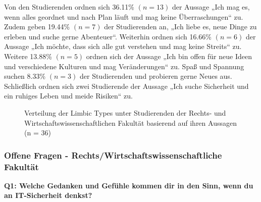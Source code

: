 \documentclass[german,report]{i1thesis}
\begin{document}
Von den Studierenden ordnen sich 36.11\% \((n = 13)\) der Aussage „Ich mag es, wenn alles geordnet und nach Plan läuft und mag keine Überraschungen“ zu. Zudem geben 19.44\% \((n = 7)\) der Studierenden an, „Ich liebe es, neue Dinge zu erleben und suche gerne Abenteuer“. Weiterhin ordnen sich 16.66\% \((n = 6)\) der Aussage „Ich möchte, dass sich alle gut verstehen und mag keine Streits“ zu. Weitere 13.88\% \((n = 5)\) ordnen sich der Aussage „Ich bin offen für neue Ideen und verschiedene Kulturen und mag Veränderungen“ zu. Spaß und Spannung suchen 8.33\% \((n = 3)\) der Studierenden und probieren gerne Neues aus. Schließlich ordnen sich zwei Studierende der Aussage „Ich suche Sicherheit und ein ruhiges Leben und meide Risiken“ zu.

\begin{figure}[H]
\centering
{}
\caption{Verteilung der Limbic Types \cite{hausel2011wissenschaftliche} unter Studierenden der Rechts- und Wirtschaftswissenschaftlichen Fakultät basierend auf ihren Aussagen (n = 36)}
\label{fig:limbic_types}
\end{figure}

\subsubsection{Offene Fragen - Rechts/Wirtschaftswissenschaftliche Fakultät}

\textbf{Q1: Welche Gedanken und Gefühle kommen dir in den Sinn, wenn du an IT-Sicherheit denkst?}
\end{document}
